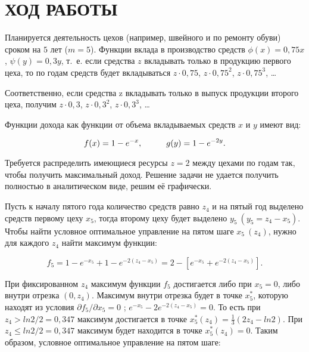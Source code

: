 
\section{ХОД РАБОТЫ}

Планируется деятельность цехов (например, швейного и по ремонту обуви) сроком на $5$ лет ($ m=5 $). Функции вклада в производство средств $ \phi(x) = 0,75x $, $ \psi(y) = 0,3y $, т.~е. если средства $z$ вкладывать только в продукцию первого цеха, то по годам средств будет вкладываться $ z \cdot 0,75 $, $ z \cdot 0,75^2 $, $ z \cdot 0,75^3 $, \ldots

Соответственно, если средства z вкладывать только в выпуск продукции второго цеха, получим $ z \cdot 0,3 $, $ z \cdot 0,3^2 $, $ z \cdot 0,3^3 $, \ldots

Функции дохода как функции от объема вкладываемых средств $x$ и $y$ имеют вид:

\begin{equation}
  f(x) = 1 - e^{-x}, \hspace{10mm}
  g(y) = 1 - e^{-2y}.
\end{equation}

Требуется распределить имеющиеся ресурсы $z = 2$ между цехами по годам так, чтобы получить максимальный доход. Решение задачи не удается получить полностью в аналитическом виде, решим её графически.

Пусть к началу пятого года количество средств равно $z_4$ и на пятый год выделено средств первому цеху $x_5$, тогда второму цеху будет выделено $y_5~(y_5 = z_4 - x_5)$. Чтобы найти условное оптимальное управление на пятом шаге $x_5~(z_4)$, нужно для каждого $z_4$ найти максимум функции:

\begin{equation}
  f_5 = 1 - e^{-x_5} + 1 - e^{-2(z_4 - x_5)} = 2 - [e^{-x_5} + e^{-2(z_4 - x_5)}].
\end{equation}

При фиксированном $z_4$ максимум функции $f_5$ достигается либо при $x_5 = 0$, либо внутри отрезка $(0, z_4)$. Максимум внутри отрезка будет в точке $x^*_5$, которую находят из условия $ \partial f_5 / \partial x_5 = 0 $ ; $ e^{-x_5} - 2e^{-2(z_4 - x_5)} = 0 $. То есть при $ z_4 > ln2 / 2 = 0,347 $ максимум достигается в точке $ x^*_5(z_4) = \frac{1}{3}(2z_4 - ln2) $. При $ z_4 \le ln2 / 2 = 0,347 $ максимум будет находится в точке $ x^*_5(z_4) = 0 $. Таким образом, условное оптимальное управление на пятом шаге:

